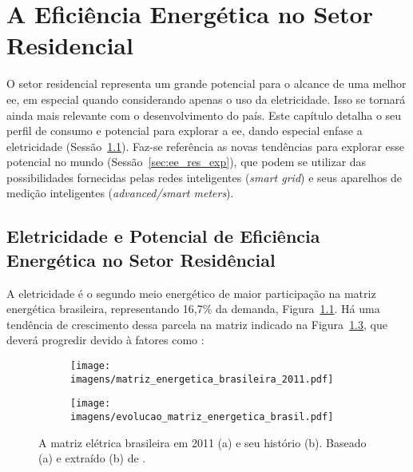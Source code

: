 \chapter{A Eficiência Energética no Setor Residencial}
\label{chap:ee_retorno}

O setor residencial representa um grande potencial para o alcance de uma melhor
\gls{ee}, em especial quando considerando apenas o uso da eletricidade. Isso se
tornará ainda mais relevante com o desenvolvimento do país. Este capítulo detalha
o seu perfil de consumo e potencial para explorar a \gls{ee}, dando 
especial enfase a eletricidade (Sessão~\ref{sec:ee_setor_residencial}). Faz-se
referência as novas tendências para explorar esse potencial no
mundo (Sessão~\ref{sec:ee_res_exp}), que podem se utilizar das possibilidades 
fornecidas pelas redes inteligentes (\emph{smart grid}) e seus aparelhos de 
medição inteligentes (\emph{advanced/smart meters}).

\section{Eletricidade e Potencial de Eficiência Energética 
no Setor Residêncial}
\label{sec:ee_setor_residencial}

A eletricidade é o segundo meio energético de maior participação na matriz 
energética brasileira, representando 16,7\% da demanda, 
Figura~\ref{fig:matriz_bra_2011}. 
Há uma tendência de crescimento dessa parcela na matriz indicado na 
Figura~\ref{fig:matriz_bra_evo}, que deverá progredir devido à fatores 
como \cite{iea_weo2010}:

\begin{figure}[h!t]
    \label{fig:eletricidade_brasil}
    \begin{center}
    \begin{subfigure}[c]{0.8\textwidth}
      \texttt{[image: imagens/matriz\_energetica\_brasileira\_2011.pdf]}
      \caption{}
      \label{fig:matriz_bra_2011}
    \end{subfigure}
    \hfill
    \begin{subfigure}[c]{0.8\textwidth}
      \texttt{[image: imagens/evolucao\_matriz\_energetica\_brasil.pdf]}
      \caption{}
      \label{fig:matriz_bra_evo}
    \end{subfigure}
  \end{center}
  \caption[Matriz energética brasileira.]{A matriz elétrica brasileira
em 2011 (a) e seu histório (b). Baseado (a) e extraído (b) de \cite{ben2012}.}
\end{figure}


